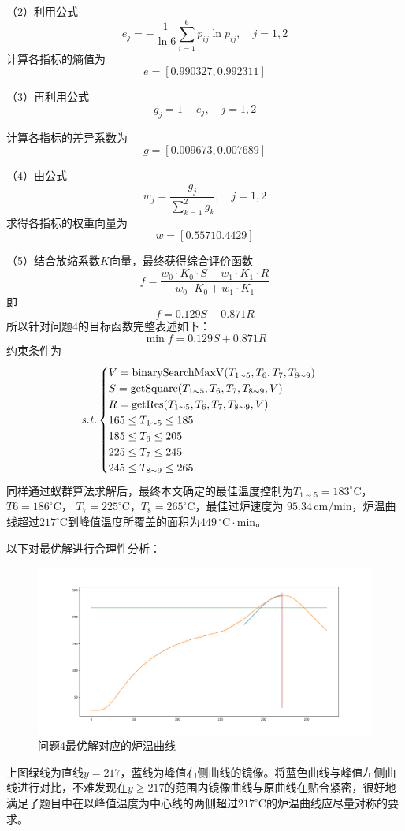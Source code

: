 \documentclass[../main.tex]{subfiles}
\begin{document}
（2）利用公式
\begin{equation}
e_{j} = - \frac{1}{ \ln 6} \sum_{i=1} ^{6} p_{ij} \ln p_{ij}, \quad j = 1 ,2
\end{equation}
计算各指标的熵值为
\[
e = [0.990327, 0.992311]
\]

（3）再利用公式
\begin{equation}
g _{j} = 1 - e_{j} , \quad j =  1, 2
\end{equation}

计算各指标的差异系数为
\[
g=[0.009673, 0.007689]
\]

（4）由公式
\begin{equation}
w_{j} = \frac{g_{j}}{\sum_{k=1}^{2} g _{k}} , \quad j = 1, 2
\end{equation}
求得各指标的权重向量为
\[
w=[0.5571   0.4429]
\]

（5）结合放缩系数\(K\)向量，最终获得综合评价函数
\[
f = \frac{w_0 \cdot K_0 \cdot S + w_1 \cdot K_1 \cdot R}{w_0 \cdot K_0 + w_1 \cdot K_1}
\]
即
\[
f=0.129 S+0.871 R
\]
所以针对问题4的目标函数完整表述如下：
\begin{equation}
\min f = 0.129 S+0.871 R
\end{equation}
约束条件为
\begin{equation}{\it s.t.}
\begin{cases}
V = \mathrm{binarySearchMaxV} (T _{1{\sim} 5}, T_{6} , T _{7},T_{8{\sim} 9})\\
S = \mathrm{getSquare} (T _{1 {\sim} 5},T _{6} , T _{7} , T _{8 {\sim} 9}, V) \\
R = \mathrm{getRes} (T _{1 {\sim} 5},T _{6} , T _{7} , T _{8 {\sim} 9}, V) \\
165 \le T_{1 {\sim} 5} \le 185\\
185 \le T _{6} \le 205 \\
225 \le T _{7} \le 245 \\
245 \le T _{8 {\sim} 9} \le 265
\end{cases}
\end{equation}
同样通过蚁群算法求解后，最终本文确定的最佳温度控制为\(T _{1 \sim 5}= 183 ^{\circ}\mathrm{C}\)，\(T6 = 186^{\circ}\mathrm{C}\)，
\(T_{7} = 225^{\circ}\mathrm{C}\)，\(T_8 = 265^{\circ}\mathrm{C}\)，最佳过炉速度为 \(95.34\,\mathrm{cm}/\mathrm{min}\)，炉温曲线超过\(217 ^{\circ}\mathrm{C}\)到峰值温度所覆盖的面积为\(449\,^{\circ}\mathrm{C} \cdot \mathrm{min}\)。

以下对最优解进行合理性分析：

\begin{figure}[H]
	\centering
	\includegraphics[scale = 0.3]{Figure_1.pdf}\caption{问题4最优解对应的炉温曲线}
\end{figure}
	
上图绿线为直线$y=217$，蓝线为峰值右侧曲线的镜像。将蓝色曲线与峰值左侧曲线进行对比，不难发现在$y\ge217$的范围内镜像曲线与原曲线在贴合紧密，很好地满足了题目中在以峰值温度为中心线的两侧超过\(217^{\circ}\mathrm{C}\)的炉温曲线应尽量对称的要求。
\end{document}
